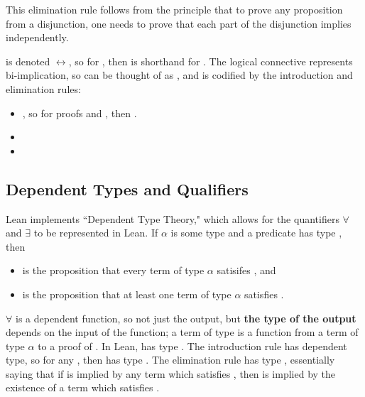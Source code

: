 \begin{description}
\begin{itemize}
        This elimination rule follows from the principle that to prove any proposition 
         from a disjunction, one needs to prove that each part of
        the disjunction implies  independently.
    \end{itemize}
    \item[\lean{Iff : Prop $\to$ Prop $\to$ Prop}] is denoted $\leftrightarrow$, so 
    for , then  is shorthand for 
    . The logical connective  represents 
    bi-implication, so  can be thought of as 
    , and is codified by the introduction
    and elimination rules: \begin{itemize}
        \item {}, so for
        proofs  and , then 
        .
        \item {}
        \item {}
    \end{itemize}

\end{description}


\subsection{Dependent Types and Qualifiers}

Lean implements ``Dependent Type Theory," which allows for the quantifiers
$\forall$ and $\exists$ to be represented in Lean. If $\alpha$ is some
type and a predicate  has type , then 
\begin{itemize}
    \item {} is the proposition that every 
    term of type $\alpha$ satisifes , and
    \item {} is the proposition that
    at least one term of type $\alpha$ satisfies .
\end{itemize}
$\forall$ is a dependent function, so not just the output, 
but \textbf{the type of the output} depends on the input of the function; 
a term of type  is a function from
a term  of type $\alpha$ to a proof of . In Lean,
 has type . The introduction
rule  has dependent type, so for any ,
then  has type . The elimination
rule  has type 
, essentially
saying that if  is implied by any term which satisfies , then 
 is implied by the existence of a term which satisfies .

